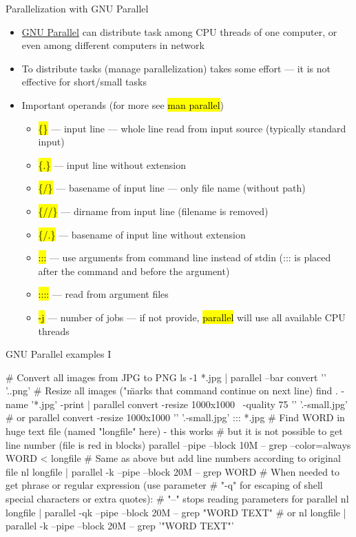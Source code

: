 \documentclass[compress, ucs, xelatex, 11pt, xcolor=svgnames,
  hyperref={
    bookmarks=true,
    unicode=true,
    colorlinks=true,
    pdftitle={Linux, command line and MetaCentrum},
    plainpages=false,
    pdfauthor={Vojtech Zeisek},
    pdfsubject={Course about use of Linux command line, writing shell scripts and using MetaCentrum of CESNET},
    pdfcreator={XeLaTeX, http://www.xelatex.org/},
    pdfkeywords={Linux, GNU, BASH, shell, command line, MetaCentrum},
    linkcolor=Sienna,
    anchorcolor=black,
    citecolor=green,
    filecolor=magenta,
    menucolor=Sienna,
    urlcolor=cyan,
    pdftex},
  url={hyphens, lowtilde} %
  ]{beamer}
\renewcommand{\texttt}[1]{\hl{\ttfamily #1}}
\begin{document}
\begin{frame}{Parallelization with GNU Parallel}
\begin{itemize}
  \item \href{https://www.gnu.org/software/parallel/}{GNU Parallel} can distribute task among CPU threads of one computer, or even among different computers in network
  \item To distribute tasks (manage parallelization) takes some effort --- it is not effective for short/small tasks
  \item Important operands (for more see \texttt{man parallel})
  \begin{itemize}
    \item \texttt{\{\}} --- input line --- whole line read from input source (typically standard input)
    \item \texttt{\{.\}} --- input line without extension
    \item \texttt{\{/\}} --- basename of input line --- only file name (without path)
    \item \texttt{\{//\}} --- dirname from input line (filename is removed)
    \item \texttt{\{/.\}} --- basename of input line without extension
    \item \texttt{:::} --- use arguments from command line instead of stdin (::: is placed after the command and before the argument)
    \item \texttt{::::} --- read from argument files
    \item \texttt{-j} --- number of jobs --- if not provide, \texttt{parallel} will use all available CPU threads
  \end{itemize}
\end{itemize}
\end{frame}

\begin{frame}[fragile]{GNU Parallel examples I}
  \begin{bashcode}
    # Convert all images from JPG to PNG
    ls -1 *.jpg | parallel --bar convert '{}' '{.}.png'
    # Resize all images ("\" marks that command continue on next line)
    find . -name '*.jpg' -print | parallel convert -resize 1000x1000 \
      -quality 75 '{}' '{.}-small.jpg' # or
    parallel convert -resize 1000x1000 '{}' '{.}-small.jpg' ::: *.jpg
    # Find WORD in huge text file (named "longfile" here) - this works
    # but it is not possible to get line number (file is red in blocks)
    parallel --pipe --block 10M -- grep --color=always WORD < longfile
    # Same as above but add line numbers according to original file
    nl longfile | parallel -k --pipe --block 20M -- grep WORD
    # When needed to get phrase or regular expression (use parameter
    # "-q" for escaping of shell special characters or extra quotes):
    # "--" stops reading parameters for parallel
    nl longfile | parallel -qk --pipe --block 20M -- grep "WORD TEXT" # or
    nl longfile | parallel -k --pipe --block 20M -- grep '"WORD TEXT"'
  \end{bashcode}
\end{frame}
\end{document}
